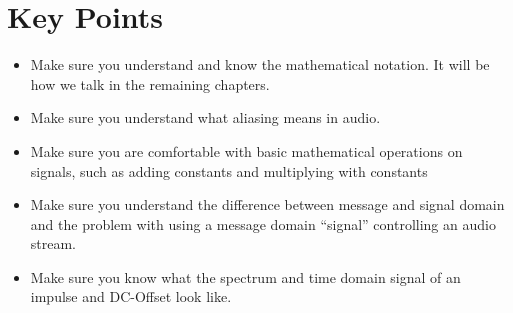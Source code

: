 \section{Key Points}
\begin{itemize}
	\item Make sure you understand and know the mathematical notation. It will be how we talk in the remaining chapters.
	\item Make sure you understand what aliasing means in audio.
	\item Make sure you are comfortable with basic mathematical operations on signals, such as adding constants and multiplying with constants
	\item Make sure you understand the difference between message and signal domain and the problem with using a message domain ``signal'' controlling an audio stream.
	\item Make sure you know what the spectrum and time domain signal of an impulse and DC-Offset look like.
\end{itemize}
